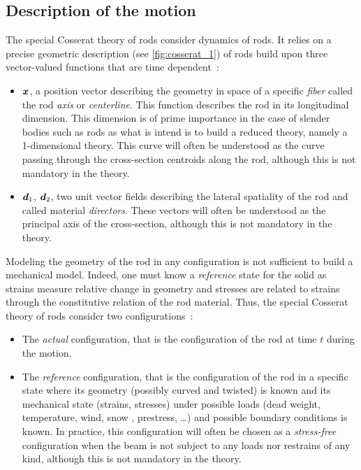 \subsection{Description of the motion}\label{sec:cosserat_motion}
The special Cosserat theory of rods consider dynamics of rods. It relies on a precise geometric description (see \cref{fig:cosserat_1}) of rods build upon three vector-valued functions that are time dependent~: 
\begin{itemize}
\item
$\boldsymbol{x}$, a position vector describing the geometry in space of a specific \emph{fiber} called the rod \emph{axis} or \emph{centerline}. This function describes the rod in its longitudinal dimension. This dimension is of prime importance in the case of slender bodies such as rods as what is intend is to build a reduced theory, namely a 1-dimensional theory. This curve will often be understood as the curve passing through the cross-section centroids along the rod, although this is not mandatory in the theory.
\item
$\boldsymbol{d}_1$, $\boldsymbol{d}_2$, two unit vector fields describing the lateral spatiality of the rod and called material \emph{directors}. These vectors will often be understood as the principal axis of the cross-section, although this is not mandatory in the theory.
\end{itemize}
Modeling the geometry of the rod in any configuration is not sufficient to build a mechanical model. Indeed, one must know a \emph{reference} state for the solid as strains measure relative change in geometry and stresses are related to strains through the constitutive relation of the rod material. Thus, the special Cosserat theory of rods consider two configurations~:
\begin{itemize}
\item
The \emph{actual} configuration, that is the configuration of the rod at time $t$ during the motion.
\item
The \emph{reference} configuration, that is the configuration of the rod in a specific state where its geometry (possibly curved and twisted) is known and its mechanical state (strains, stresses) under possible loads (dead weight, temperature, wind, snow , prestress, \dots) and possible boundary conditions is known. In practice, this configuration will often be chosen as a \emph{stress-free} configuration when the beam is not subject to any loads nor restrains of any kind, although this is not mandatory in the theory.
\end{itemize}
